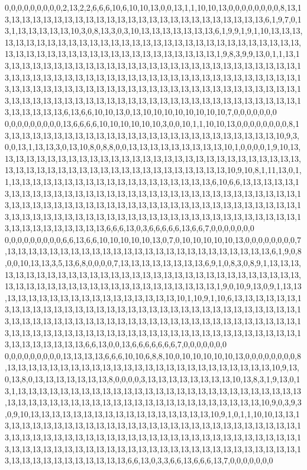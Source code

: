 0,0,0,0,0,0,0,0,0,2,13,2,2,6,6,6,10,6,10,10,13,0,0,13,1,1,10,10,13,0,0,0,0,0,0,0,0,8,13,13,13,13,13,13,13,13,13,13,13,13,13,13,13,13,13,13,13,13,13,13,13,13,13,13,6,1,9,7,0,13,1,13,13,13,13,13,10,3,0,8,13,3,0,3,10,13,13,13,13,13,13,13,6,1,9,9,1,9,1,10,13,13,13,13,13,13,13,13,13,13,13,13,13,13,13,13,13,13,13,13,13,13,13,13,13,13,13,13,13,13,13,13,13,13,13,13,13,13,13,13,13,13,13,13,13,13,13,13,13,13,13,1,9,8,3,9,9,13,0,1,1,13,13,13,13,13,13,13,13,13,13,13,13,13,13,13,13,13,13,13,13,13,13,13,13,13,13,13,13,13,13,13,13,13,13,13,13,13,13,13,13,13,13,13,13,13,13,13,13,13,13,13,13,13,13,13,13,13,13,13,13,13,13,13,13,13,13,13,13,13,13,13,13,13,13,13,13,13,13,13,13,13,13,13,13,13,13,13,13,13,13,13,13,13,13,13,13,13,13,13,13,13,13,13,13,13,13,13,13,13,13,13,13,13,13,13,13,13,13,13,6,13,6,6,10,10,13,0,13,10,10,10,10,10,10,10,10,7,0,0,0,0,0,0,0
0,0,0,0,0,0,0,0,0,13,6,6,6,6,10,10,10,10,10,10,3,0,0,10,1,1,10,10,13,0,0,0,0,0,0,0,0,8,13,13,13,13,13,13,13,13,13,13,13,13,13,13,13,13,13,13,13,13,13,13,13,13,13,13,10,9,3,0,0,13,1,13,13,3,0,13,10,8,0,8,8,0,0,13,13,13,13,13,13,13,13,13,10,1,0,0,0,0,1,9,10,13,13,13,13,13,13,13,13,13,13,13,13,13,13,13,13,13,13,13,13,13,13,13,13,13,13,13,13,13,13,13,13,13,13,13,13,13,13,13,13,13,13,13,13,13,13,13,13,13,13,10,9,10,8,1,11,13,0,1,1,13,13,13,13,13,13,13,13,13,13,13,13,13,13,13,13,13,13,13,6,10,6,6,13,13,13,13,13,13,13,13,13,13,13,13,13,13,13,13,13,13,13,13,13,13,13,13,13,13,13,13,13,13,13,13,13,13,13,13,13,13,13,13,13,13,13,13,13,13,13,13,13,13,13,13,13,13,13,13,13,13,13,13,13,13,13,13,13,13,13,13,13,13,13,13,13,13,13,13,13,13,13,13,13,13,13,13,13,13,13,13,13,13,13,13,13,13,13,13,13,13,13,6,6,6,13,0,3,6,6,6,6,6,13,6,6,7,0,0,0,0,0,0,0
0,0,0,0,0,0,0,0,0,6,6,13,6,6,10,10,10,10,10,13,0,7,0,10,10,10,10,10,13,0,0,0,0,0,0,0,0,7,13,13,13,13,13,13,13,13,13,13,13,13,13,13,13,13,13,13,13,13,13,13,13,13,13,6,1,9,0,8,0,0,10,13,13,3,5,13,6,8,0,0,0,0,7,13,13,13,13,13,13,13,13,6,9,1,0,8,3,0,8,9,1,13,13,13,13,13,13,13,13,13,13,13,13,13,13,13,13,13,13,13,13,13,13,13,13,13,13,13,13,13,13,13,13,13,13,13,13,13,13,13,13,13,13,13,13,13,13,13,13,13,13,13,1,9,0,10,9,13,0,9,1,13,13,13,13,13,13,13,13,13,13,13,13,13,13,13,13,13,13,10,1,10,9,1,10,6,13,13,13,13,13,13,13,13,13,13,13,13,13,13,13,13,13,13,13,13,13,13,13,13,13,13,13,13,13,13,13,13,13,13,13,13,13,13,13,13,13,13,13,13,13,13,13,13,13,13,13,13,13,13,13,13,13,13,13,13,13,13,13,13,13,13,13,13,13,13,13,13,13,13,13,13,13,13,13,13,13,13,13,13,13,13,13,13,13,13,13,13,13,13,13,13,13,13,6,6,13,0,0,13,6,6,6,6,6,6,6,7,0,0,0,0,0,0,0
0,0,0,0,0,0,0,0,0,13,13,13,13,6,6,6,10,10,6,8,8,10,0,10,10,10,10,10,13,0,0,0,0,0,0,0,0,8,13,13,13,13,13,13,13,13,13,13,13,13,13,13,13,13,13,13,13,13,13,13,13,13,13,10,9,13,0,13,8,0,13,13,13,13,13,13,13,8,0,0,0,0,3,13,13,13,13,13,13,13,13,10,13,8,3,1,9,13,0,13,1,13,13,13,13,13,13,13,13,13,13,13,13,13,13,13,13,13,13,13,13,13,13,13,13,13,13,13,13,13,13,13,13,13,13,13,13,13,13,13,13,13,13,13,13,13,13,13,13,13,13,13,10,9,0,3,9,3,0,9,10,13,13,13,13,13,13,13,13,13,13,13,13,13,13,13,13,13,10,9,1,0,1,1,10,10,13,13,13,13,13,13,13,13,13,13,13,13,13,13,13,13,13,13,13,13,13,13,13,13,13,13,13,13,13,13,13,13,13,13,13,13,13,13,13,13,13,13,13,13,13,13,13,13,13,13,13,13,13,13,13,13,13,13,13,13,13,13,13,13,13,13,13,13,13,13,13,13,13,13,13,13,13,13,13,13,13,13,13,13,13,13,13,13,13,13,13,13,13,13,13,13,13,13,6,6,13,0,3,3,6,6,13,6,6,6,13,7,0,0,0,0,0,0,0
